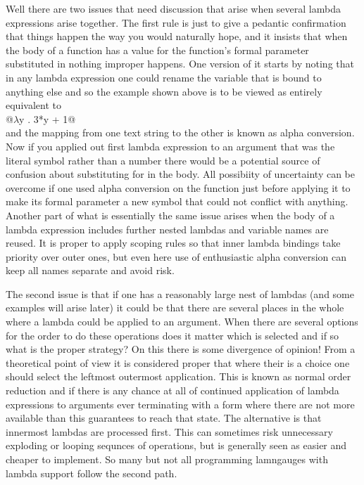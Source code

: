 Well there are two issues that need discussion that arise when several lambda
expressions arise together. The first rule is just to give a pedantic
confirmation that things happen the way you would naturally hope, and
it insists that when the body of a function has a value for the function's
formal parameter substituted in nothing improper happens. One version of
it starts by noting that in any lambda expression one could rename the
variable that is bound to anything else and so the example shown above is to
be viewed as entirely equivalent to \\
\verb@    @$\lambda$\verb@ y . 3*y + 1@\\
and the mapping from one text string to the other is known as alpha conversion.
Now if you applied out first lambda expression to an argument that was the
literal symbol \verb@x@ rather than a number there would be a potential
source of confusion about substituting for \verb@x@ in the body. All
possibiity of uncertainty can be overcome if one used alpha conversion on the
function just before applying it to make its formal parameter a new symbol
that could not conflict with anything. Another part of what is essentially the
same issue arises when the body of a lambda expression includes further nested
lambdas and variable names are reused. It is proper to apply scoping rules so
that inner lambda bindings take priority over outer ones, but even here use
of enthusiastic alpha conversion can keep all names separate and avoid
risk.

The second issue is that if one has a reasonably large nest of lambdas (and
some examples will arise later) it could be that there are several places in
the whole where a lambda could be applied to an argument. When there are
several options for the order to do these operations does it matter which
is selected and if so what is the proper strategy? On this there is some
divergence of opinion! From a theoretical point of view it is considered
proper that where their is a choice one should select the leftmost
outermost application. This is known as normal order reduction and if there is
any chance at all of continued application of lambda expressions to
arguments ever terminating with a form where there are not more available
than this guarantees to reach that state. The alternative is that
innermost lambdas are processed first. This can sometimes risk
unnecessary exploding or looping sequnces of operations, but is generally seen
as easier and cheaper to implement. So many but not all programming
lamngauges with lambda support follow the second path.

